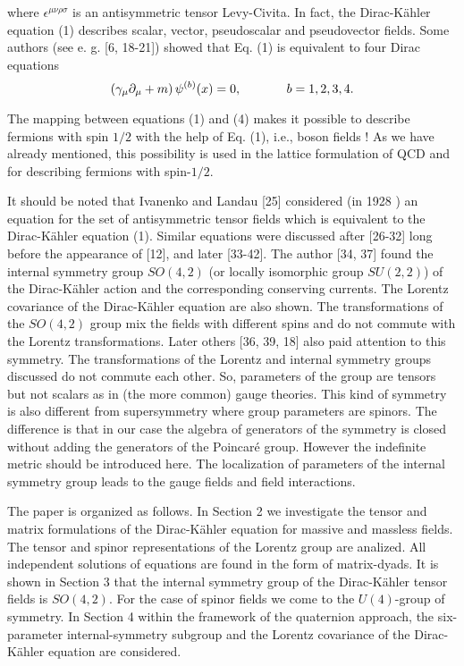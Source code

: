 \documentclass[a4paper,12pt]{article}
\begin{document}
where $\epsilon ^{\mu \nu \rho \sigma }$ is an antisymmetric tensor
Levy-Civita. In fact, the Dirac-K\"ahler equation (1) describes scalar,
vector, pseudoscalar and pseudovector fields. Some authors (see e. g. [6,
18-21]) showed that Eq. (1) is equivalent to four Dirac equations
\begin{equation}
\left( \gamma _\mu \partial _\mu +m\right) \psi ^{(b)}(x)=0 ,
\hspace{0.5in}b=1, 2, 3, 4 . \label{4}
\end{equation}

The mapping between equations (1) and (4) makes it possible to describe
fermions with spin $1/2$ with the help of Eq. (1), i.e., boson fields ! As
we have already mentioned, this possibility is used in the lattice
formulation of QCD and for describing fermions with spin-$1/2$.

It should be noted that Ivanenko and Landau [25] considered (in 1928 ) an
equation for the set of antisymmetric tensor fields which is equivalent to
the Dirac-K\"ahler equation (1). Similar equations were discussed after
[26-32] long before the appearance of [12], and later [33-42]. The author
[34, 37] found the internal symmetry group $SO(4,2)$ (or locally isomorphic
group $SU(2,2)$) of the Dirac-K\"ahler action and the corresponding
conserving currents. The Lorentz covariance of the Dirac-K\"ahler equation
are also shown. The transformations of the $SO(4,2)$ group mix the fields
with different spins and do not commute with the Lorentz transformations.
Later others [36, 39, 18] also paid attention to this symmetry. The
transformations of the Lorentz and internal symmetry groups discussed do not
commute each other. So, parameters of the group are tensors but not scalars
as in (the more common) gauge theories. This kind of symmetry is also
different from supersymmetry where group parameters are spinors. The
difference is that in our case the algebra of generators of the symmetry is
closed without adding the generators of the Poincar\'e group. However the
indefinite metric should be introduced here. The localization of parameters
of the internal symmetry group leads to the gauge fields and field
interactions.

The paper is organized as follows. In Section 2 we investigate the tensor
and matrix formulations of the Dirac-K\"ahler equation for massive and
massless fields. The tensor and spinor representations of the Lorentz group
are analized. All independent solutions of equations are found in the form
of matrix-dyads. It is shown in Section 3 that the internal symmetry group
of the Dirac-K\"ahler tensor fields is $SO(4,2)$. For the case of spinor
fields we come to the $U(4)$-group of symmetry. In Section 4 within the
framework of the quaternion approach, the six-parameter internal-symmetry
subgroup and the Lorentz covariance of the Dirac-K\"ahler equation are
considered.
\end{document}
